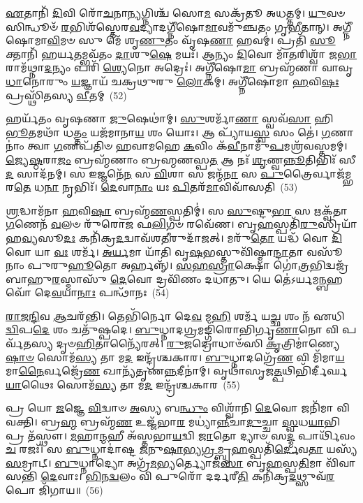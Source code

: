 \-\ul{𑌏}\-𑌤𑌾𑌨𑌿᳴ \ul{𑌦𑌿}\-𑌵𑌿 𑌰𑍋᳴\-\ul{𑌚}\-𑌨𑌾\-\ul{𑌨𑍍𑌯}\-𑌗𑍍𑌨𑌿𑌶𑍍𑌚᳴ 𑌸𑍋\-\ul{𑌮} 𑌸𑌕𑍍𑌰᳴𑌤𑍂 𑌅𑌧𑌤𑍍𑌤𑌮𑍍। \ul{𑌯𑍁}\-𑌵𑍞 𑌸𑌿𑌨𑍍𑌧𑍂𑍞᳴ \ul{𑌰}\-𑌭𑌿𑌶᳴𑌸𑍍𑌤𑍇𑌰\-\ul{𑌵}\-𑌦𑍍𑌯𑌾𑌦𑌗𑍍𑌨𑍀᳴𑌷𑍋\-\ul{𑌮𑌾}\-𑌵𑌮𑍁᳴𑌞𑍍𑌚𑌤𑌂 𑌗𑍃\-\ul{𑌭𑍀}\-𑌤𑌾𑌨𑍍। 𑌅𑌗𑍍𑌨𑍀᳴𑌷𑍋𑌮𑌾\-\ul{𑌵𑌿}\-𑌮𑍞 𑌸𑍁 𑌮𑍇᳴ 𑌶𑍃\-\ul{𑌣𑍁}\-𑌤𑌂 𑌵𑍃᳴𑌷\-\ul{𑌣𑌾} 𑌹𑌵𑌮𑍍॑। 𑌪𑍍𑌰𑌤𑌿᳴ \ul{𑌸𑍂}\-𑌕𑍍𑌤𑌾𑌨𑌿᳴ 𑌹𑌰𑍍𑌯\-\ul{𑌤}\-𑌮𑍍𑌭𑌵᳴𑌤𑌂 \ul{𑌦𑌾}\-𑌶𑍁\-\ul{𑌷𑍇} 𑌮𑌯𑌃᳴। 𑌆𑌨𑍍𑌯𑌂 \ul{𑌦𑌿}\-𑌵𑍋 𑌮𑌾᳴\-\ul{𑌤}\-𑌰𑌿𑌶𑍍𑌵𑌾᳴ 𑌜\-\ul{𑌭𑌾}\-𑌰𑌾𑌮᳴𑌥𑍍𑌨𑌾\-\ul{𑌦}\-𑌨𑍍𑌯𑌂 𑌪𑌰𑌿᳴ \ul{𑌶𑍍𑌯𑍇}\-𑌨𑍋 𑌅𑌦𑍍𑌰𑍇𑌃॑। 𑌅𑌗𑍍𑌨𑍀᳴𑌷𑍋\-\ul{𑌮𑌾} 𑌬𑍍𑌰𑌹𑍍𑌮᳴𑌣𑌾 𑌵𑌾𑌵𑍃\-\ul{𑌧𑌾}\-𑌨𑍋𑌰𑍁𑌂 \ul{𑌯}\-𑌜𑍍𑌞𑌾𑌯᳴ 𑌚𑌕𑍍𑌰𑌥𑍁𑌰𑍁 \ul{𑌲𑍋}\-𑌕𑌮𑍍। 𑌅𑌗𑍍𑌨𑍀᳴𑌷𑍋𑌮𑌾 \ul{𑌹}\-𑌵𑌿\-\ul{𑌷𑌃} 𑌪𑍍𑌰𑌸𑍍𑌥𑌿᳴𑌤𑌸𑍍𑌯 \ul{𑌵𑍀}\-𑌤𑌮𑍍~(52)

𑌹𑌰𑍍𑌯᳴𑌤𑌂 𑌵𑍃𑌷𑌣𑌾 \ul{𑌜𑍁}\-𑌷𑍇𑌥𑌾॑𑌮𑍍। \ul{𑌸𑍁}\-𑌶𑌰𑍍𑌮𑌾᳴\-\ul{𑌣𑌾} 𑌸𑍍𑌵𑌵᳴\-\ul{𑌸𑌾} 𑌹𑌿 \ul{𑌭𑍂}\-𑌤𑌮𑌥𑌾᳴ 𑌧\-\ul{𑌤𑍍𑌤𑌂} 𑌯𑌜᳴𑌮𑌾𑌨𑌾\-\ul{𑌯} 𑌶𑌂 𑌯𑍋𑌃। 𑌆 𑌪𑍍𑌯𑌾᳴𑌯\-\ul{𑌸𑍍𑌵} 𑌸𑌂 𑌤𑍇॑। \ul{𑌗}\-𑌣𑌾𑌨𑌾𑌂॑ 𑌤𑍍𑌵𑌾 \ul{𑌗}\-𑌣𑌪᳴𑌤𑌿𑍞 𑌹𑌵𑌾𑌮𑌹𑍇 \ul{𑌕}\-𑌵𑌿𑌂 𑌕᳴\-\ul{𑌵𑍀}\-𑌨𑌾𑌮𑍁᳴\-\ul{𑌪}\-𑌮𑌶𑍍𑌰᳴𑌵𑌸𑍍𑌤𑌮𑌮𑍍। \ul{𑌜𑍍𑌯𑍇}\-\-\ul{𑌷𑍍𑌠}\-𑌰𑌾\-\ul{𑌜𑌂} 𑌬𑍍𑌰𑌹𑍍𑌮᳴𑌣𑌾𑌂 𑌬𑍍𑌰𑌹𑍍𑌮𑌣𑌸𑍍𑌪\-\ul{𑌤} 𑌆 𑌨𑌃᳴ \ul{𑌶𑍃}\-𑌣𑍍𑌵\-\ul{𑌨𑍍𑌨𑍂}\-𑌤𑌿𑌭𑌿𑌃᳴ 𑌸𑍀\-\ul{𑌦} 𑌸𑌾𑌦᳴𑌨𑌮𑍍। 𑌸 𑌇𑌜𑍍𑌜𑌨𑍇᳴\-\ul{𑌨} 𑌸 \ul{𑌵𑌿}\-𑌶𑌾 𑌸 𑌜𑌨𑍍𑌮᳴\-\ul{𑌨𑌾} 𑌸 \ul{𑌪𑍁}\-𑌤𑍍𑌰𑍈𑌰𑍍𑌵𑌾𑌜᳴𑌮𑍍𑌭𑌰\-\ul{𑌤𑍇} 𑌧\-\ul{𑌨𑌾} 𑌨𑍃𑌭𑌿𑌃᳴। \ul{𑌦𑍇}\-𑌵𑌾\-\ul{𑌨𑌾𑌂} 𑌯𑌃 \ul{𑌪𑌿}\-𑌤𑌰᳴\-\ul{𑌮𑌾}\-𑌵𑌿𑌵𑌾᳴𑌸𑌤𑌿~(53)

\-\ul{𑌶𑍍𑌰}\-𑌦𑍍𑌧𑌾𑌮᳴𑌨𑌾 \ul{𑌹}\-𑌵𑌿\-\ul{𑌷𑌾} 𑌬𑍍𑌰𑌹𑍍𑌮᳴\-\ul{𑌣}\-𑌸𑍍𑌪𑌤𑌿𑌮𑍍॑। 𑌸 \ul{𑌸𑍁}\-𑌷𑍍𑌟𑍁\-\ul{𑌭𑌾} 𑌸 𑌋𑌕𑍍𑌵᳴𑌤𑌾 \ul{𑌗}\-𑌣𑍇𑌨᳴ \ul{𑌵}\-𑌲𑍞 𑌰𑍁᳴𑌰𑍋𑌜 𑌫\-\ul{𑌲𑌿}\-𑌗𑍞 𑌰𑌵𑍇᳴𑌣। 𑌬𑍃\-\ul{𑌹}\-𑌸𑍍𑌪𑌤𑌿᳴\-\ul{𑌰𑍁}\-𑌸𑍍𑌰𑌿𑌯𑌾᳴ 𑌹\-\ul{𑌵𑍍𑌯}\-𑌸𑍂\-\ul{𑌦𑌃} 𑌕𑌨𑌿᳴𑌕𑍍𑌰\-\ul{𑌦}\-𑌦𑍍𑌵𑌾𑌵᳴𑌶\-\ul{𑌤𑍀}\-𑌰𑍁𑌦𑌾᳴𑌜𑌤𑍍। 𑌮𑌰𑍁᳴\-\ul{𑌤𑍋} 𑌯𑌦𑍍𑌧᳴ 𑌵𑍋 \ul{𑌦𑌿}\-𑌵𑍋 𑌯𑌾 \ul{𑌵𑌃} 𑌶𑌰𑍍𑌮᳴। \ul{𑌅}\-\-\ul{𑌰𑍍𑌯}\-𑌮𑌾 𑌯𑌾᳴𑌤𑌿 𑌵𑍃\-\ul{𑌷}\-𑌭𑌸𑍍𑌤𑍁𑌵𑌿᳴𑌷𑍍𑌮𑌾\-\ul{𑌨𑍍𑌦𑌾}\-𑌤𑌾 𑌵𑌸𑍂᳴𑌨𑌾𑌂 𑌪𑍁𑌰𑍁\-\ul{𑌹𑍂}\-𑌤𑍋 𑌅𑌰𑍍\mbox{}𑌹𑌨𑍍𑌨𑍍᳴। \ul{𑌸}\-\-\ul{𑌹}\-\-\ul{𑌸𑍍𑌰𑌾}\-𑌕𑍍𑌷𑍋 𑌗𑍋॑\-\ul{𑌤𑍍𑌰}\-𑌭𑌿𑌦𑍍𑌵𑌜𑍍𑌰᳴𑌬𑌾𑌹𑍁\-\ul{𑌰}\-𑌸𑍍𑌮𑌾𑌸𑍁᳴ \ul{𑌦𑍇}\-𑌵𑍋 𑌦𑍍𑌰𑌵𑌿᳴𑌣𑌂 𑌦𑌧𑌾𑌤𑍁। 𑌯𑍇 𑌤𑍇॑\-𑌽𑌰𑍍𑌯𑌮\-\ul{𑌨𑍍𑌬}\-𑌹𑌵𑍋᳴ 𑌦𑍇\-\ul{𑌵}\-𑌯𑌾\-\ul{𑌨𑌾𑌃} 𑌪𑌨𑍍𑌥𑌾᳴𑌨𑌃~(54)

\-\ul{𑌰𑌾}\-\-\ul{𑌜}\-\-\ul{𑌨𑍍𑌦𑌿}\-𑌵 \ul{𑌆}\-𑌚𑌰᳴𑌨𑍍𑌤𑌿। 𑌤𑍇𑌭𑌿᳴𑌰𑍍𑌨𑍋 𑌦𑍇\-\ul{𑌵} 𑌮\-\ul{𑌹𑌿} 𑌶𑌰𑍍𑌮᳴ 𑌯\-\ul{𑌚𑍍𑌛} 𑌶𑌂 𑌨᳴ 𑌏𑌧𑌿 \ul{𑌦𑍍𑌵𑌿}\-𑌪\-\ul{𑌦𑍇} 𑌶𑌂 𑌚𑌤𑍁᳴𑌷𑍍𑌪𑌦𑍇। \ul{𑌬𑍁}\-𑌧𑍍𑌨𑌾𑌦\-\ul{𑌗𑍍𑌰}\-𑌮𑌙𑍍𑌗𑌿᳴𑌰𑍋𑌭𑌿𑌰𑍍𑌗𑍃\-\ul{𑌣𑌾}\-𑌨𑍋 𑌵𑌿 𑌪𑌰𑍍𑌵᳴𑌤𑌸𑍍𑌯 𑌦𑍃𑍞\-\ul{𑌹𑌿}\-𑌤𑌾𑌨𑍍𑌯𑍈᳴𑌰𑌤𑍍। \ul{𑌰𑍁}\-𑌜𑌦𑍍𑌰𑍋𑌧𑌾𑍞᳴𑌸𑌿 \ul{𑌕𑍃}\-𑌤𑍍𑌰𑌿𑌮𑌾॑𑌣𑍍𑌯𑍇\-\ul{𑌷𑌾}\-\-\ul{𑍞} 𑌸𑍋𑌮᳴\-\ul{𑌸𑍍𑌯} 𑌤𑌾 𑌮\-\ul{𑌦} 𑌇𑌨𑍍𑌦𑍍𑌰᳴𑌶𑍍𑌚𑌕𑌾𑌰। \ul{𑌬𑍁}\-𑌧𑍍𑌨𑌾𑌦𑌗𑍍𑌰𑍇᳴\-\ul{𑌣} 𑌵𑌿 𑌮𑌿᳴𑌮𑌾\-\ul{𑌯} 𑌮𑌾\-\ul{𑌨𑍈}\-𑌰𑍍𑌵𑌜𑍍𑌰𑍇᳴\-\ul{𑌣} 𑌖𑌾𑌨𑍍𑌯᳴𑌤𑍃𑌣\-\ul{𑌨𑍍𑌨}\-𑌦𑍀𑌨𑌾॑𑌮𑍍। 𑌵𑍃𑌥𑌾᳴𑌸𑍃𑌜\-\ul{𑌤𑍍𑌪}\-𑌥𑌿𑌭𑌿᳴𑌰𑍍𑌦𑍀𑌰𑍍𑌘\-\ul{𑌯𑌾}\-𑌥𑍈𑌃 𑌸𑍋𑌮᳴\-\ul{𑌸𑍍𑌯} 𑌤𑌾 𑌮\-\ul{𑌦} 𑌇𑌨𑍍𑌦𑍍𑌰᳴𑌶𑍍𑌚𑌕𑌾𑌰~(55)

𑌪𑍍𑌰 𑌯𑍋 \ul{𑌜}\-𑌜𑍍𑌞𑍇 \ul{𑌵𑌿}\-𑌦𑍍𑌵𑌾𑍞 \ul{𑌅}\-𑌸𑍍𑌯 𑌬\-\ul{𑌨𑍍𑌧𑍁𑌂} 𑌵𑌿𑌶𑍍𑌵𑌾᳴𑌨𑌿 \ul{𑌦𑍇}\-𑌵𑍋 𑌜𑌨𑌿᳴𑌮𑌾 𑌵𑌿𑌵𑌕𑍍𑌤𑌿। 𑌬𑍍𑌰\-\ul{𑌹𑍍𑌮} 𑌬𑍍𑌰𑌹𑍍𑌮᳴\-\ul{𑌣} 𑌉𑌜𑍍𑌜᳴𑌭𑌾\-\ul{𑌰} 𑌮𑌧𑍍𑌯𑌾॑\-\ul{𑌨𑍍𑌨𑍀}\-𑌚𑌾\-\ul{𑌦𑍁}\-𑌚𑍍𑌚𑌾 \ul{𑌸𑍍𑌵}\-𑌧\-\ul{𑌯𑌾}\-𑌭𑌿 𑌪𑍍𑌰 𑌤᳴𑌸𑍍𑌥𑍗। \ul{𑌮}\-𑌹𑌾\-\ul{𑌨𑍍𑌮}\-𑌹𑍀 𑌅᳴𑌸𑍍𑌤𑌭𑌾\-\ul{𑌯}\-𑌦𑍍𑌵𑌿 \ul{𑌜𑌾}\-𑌤𑍋 𑌦𑍍𑌯𑌾𑍞 𑌸\-\ul{𑌦𑍍𑌮} 𑌪𑌾𑌰𑍍𑌥𑌿᳴𑌵𑌂 \ul{𑌚} 𑌰𑌜𑌃᳴। 𑌸 \ul{𑌬𑍁}\-𑌧𑍍𑌨𑌾𑌦𑌾॑𑌷𑍍𑌟 \ul{𑌜}\-𑌨𑍁\-\ul{𑌷𑌾}\-𑌭𑍍𑌯\-\ul{𑌗𑍍𑌰}\-𑌮𑍍𑌬𑍃\-\ul{𑌹}\-𑌸𑍍𑌪𑌤𑌿᳴\-\ul{𑌰𑍍𑌦𑍇}\-𑌵\-\ul{𑌤𑌾} 𑌯𑌸𑍍𑌯᳴ \ul{𑌸}\-𑌮𑍍𑌰𑌾𑌟𑍍। \ul{𑌬𑍁}\-𑌧𑍍𑌨𑌾𑌦𑍍𑌯𑍋 𑌅𑌗𑍍𑌰᳴\-\ul{𑌮}\-𑌭𑍍𑌯𑌰𑍍𑌤𑍍𑌯𑍋𑌜᳴\-\ul{𑌸𑌾} 𑌬𑍃\-\ul{𑌹}\-𑌸𑍍𑌪\-\ul{𑌤𑌿}\-𑌮𑌾 𑌵𑌿᳴𑌵𑌾𑌸𑌨𑍍𑌤𑌿 \ul{𑌦𑍇}\-𑌵𑌾𑌃। \ul{𑌭𑌿}\-𑌨\-\ul{𑌦𑍍𑌵}\-𑌲𑌂 𑌵𑌿 𑌪𑍁𑌰𑍋᳴ 𑌦𑌰𑍍𑌦𑌰𑍀\-\ul{𑌤𑌿} 𑌕𑌨𑌿᳴𑌕𑍍𑌰\-\ul{𑌦}\-𑌥𑍍𑌸𑍁𑌵᳴\-\ul{𑌰}\-𑌪𑍋 𑌜𑌿᳴𑌗𑌾𑌯॥~(56)

